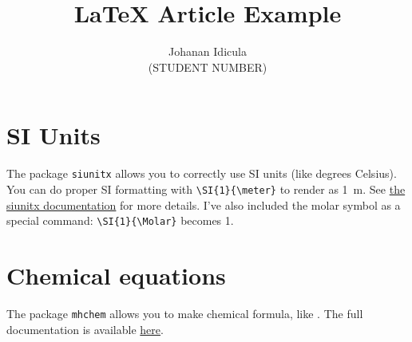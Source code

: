 \documentclass[12pt, oneside]{article}        %
\title{\textbf{\LaTeX{} Article Example}}
\author{Johanan Idicula
		\\ (STUDENT NUMBER)
	}
\begin{document}
\maketitle
\section{SI Units}

The package \texttt{siunitx} allows you to correctly use SI units (like degrees Celsius). You can do proper SI formatting with \texttt{\textbackslash SI\{1\}\{\textbackslash meter\}} to render as \SI{1}{\meter}. See \href{http://ctan.mirror.rafal.ca/macros/latex/contrib/siunitx/siunitx.pdf}{the siunitx documentation} for more details. I've also included the molar symbol as a special command: \texttt{\textbackslash SI\{1\}\{\textbackslash Molar\}} becomes \SI{1}{\Molar}.

\section{Chemical equations}

The package \texttt{mhchem} allows you to make chemical formula, like . The full documentation is available \href{ftp://www.ctan.org/tex-archive/macros/latex/contrib/mhchem/mhchem.pdf}{here}.
\end{document}
